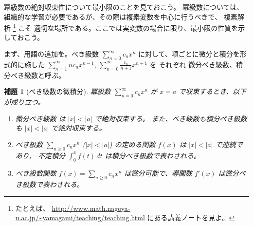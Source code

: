 \documentclass[a4paper]{jsarticle}
\newtheorem{Lemma}[Theorem]{補題}
\theoremstyle{definition}
\theoremstyle{remark}
\begin{document}
冪級数の絶対収束性について最小限のことを見ておこう。
冪級数については、組織的な学習が必要であるが、その際は複素変数を中心に行うべきで、
複素解析
\footnote{たとえば、
\url{http://www.math.nagoya-u.ac.jp/~yamagami/teaching/teaching.html}
にある講義ノートを見よ。
}
こそ 適切な場所である。ここでは実変数の場合に限り、最小限の性質を示しておこう。

まず、用語の追加を。べき級数 $\sum_{n=0}^\infty c_n x^n$ に対して、項ごとに微分と積分を形式的に施した $\sum_{n=1}^\infty nc_n x^{n-1}$,
$\sum_{n=0}^\infty \frac{c_n}{n+1} x^{n+1}$ を それぞれ 微分べき級数、積分べき級数と呼ぶ。

\begin{Lemma}[べき級数の微積分]
  冪級数 $\sum_{n = 0}^\infty c_nx^n$ が $x=a$ で収束するとき、以下が成り立つ。
  \begin{enumerate}
  \item
    微分べき級数 は $|x| < |a|$ で絶対収束する。
    また、べき級数も積分べき級数も $|x| < |a|$ で絶対収束する。
  \item
    べき級数 $\sum_{n \geq 0} c_n x^n$ ($|x| < |a|$) の定める関数 $f(x)$ は $|x| < |a|$ で連続であり、
  不定積分 $\displaystyle \int_0^x f(t)\, dt$ は積分べき級数で表わされる。
  \item
    べき級数関数 $f(x) = \sum_{n \geq 0} c_n x^n$ は微分可能で、導関数 $f'(x)$ は微分べき級数で表わされる。
  \end{enumerate}
\end{Lemma}
\end{document}
